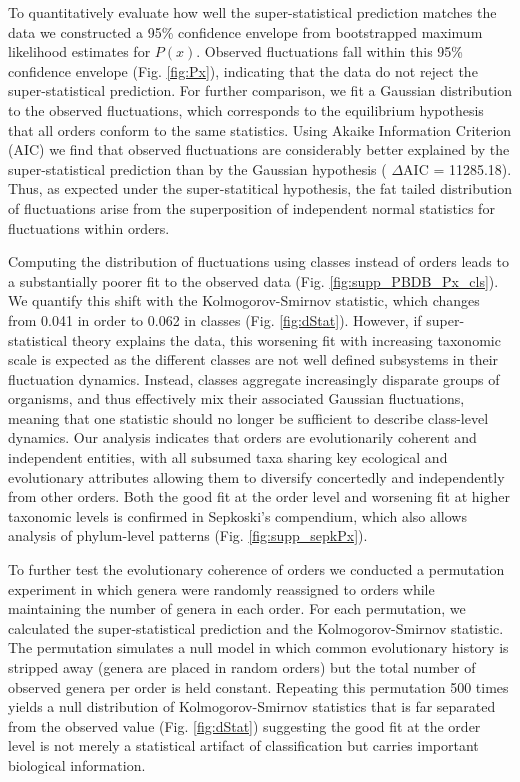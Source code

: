 \documentclass[11pt]{article}
\begin{document}
To quantitatively evaluate how well the super-statistical prediction
matches the data we constructed a 95\% confidence envelope from
bootstrapped maximum likelihood estimates for $P(x)$. Observed
fluctuations fall within this 95\% confidence envelope
(Fig. \ref{fig:Px}), indicating that the data do not reject the
super-statistical prediction. For further comparison, we fit a
Gaussian distribution to the observed fluctuations, which corresponds
to the equilibrium hypothesis that all orders conform to the same
statistics. Using Akaike Information Criterion (AIC) we find that
observed fluctuations are considerably better explained by the
super-statistical prediction than by the Gaussian hypothesis ({\small
  $\Delta$}AIC = 11285.18). Thus, as expected under the
super-statitical hypothesis, the fat tailed distribution of
fluctuations arise from the superposition of independent normal
statistics for fluctuations within orders.

Computing the distribution of fluctuations using classes instead of
orders leads to a substantially poorer fit to the observed data
(Fig. \ref{fig:supp_PBDB_Px_cls}). We quantify this shift with the
Kolmogorov-Smirnov statistic, which changes from 0.041 in order to
0.062 in classes (Fig. \ref{fig:dStat}). However, if super-statistical
theory explains the data, this worsening fit with increasing taxonomic
scale is expected as the different classes are not well defined
subsystems in their fluctuation dynamics. Instead, classes aggregate
increasingly disparate groups of organisms, and thus effectively mix
their associated Gaussian fluctuations, meaning that one statistic
should no longer be sufficient to describe class-level dynamics. Our
analysis indicates that orders are evolutionarily coherent and
independent entities, with all subsumed taxa sharing key ecological
and evolutionary attributes allowing them to diversify concertedly and
independently from other orders. Both the good fit at the order level
and worsening fit at higher taxonomic levels is confirmed in
Sepkoski's compendium, which also allows analysis of phylum-level
patterns (Fig. \ref{fig:supp_sepkPx}).

To further test the evolutionary coherence of orders we conducted a
permutation experiment in which genera were randomly reassigned to
orders while maintaining the number of genera in each order. For each
permutation, we calculated the super-statistical prediction and the
Kolmogorov-Smirnov statistic. The permutation simulates a null model
in which common evolutionary history is stripped away (genera are
placed in random orders) but the total number of observed genera per
order is held constant.  Repeating this permutation 500 times yields a
null distribution of Kolmogorov-Smirnov statistics that is far
separated from the observed value (Fig. \ref{fig:dStat}) suggesting
the good fit at the order level is not merely a statistical artifact
of classification but carries important biological information.
\end{document}

